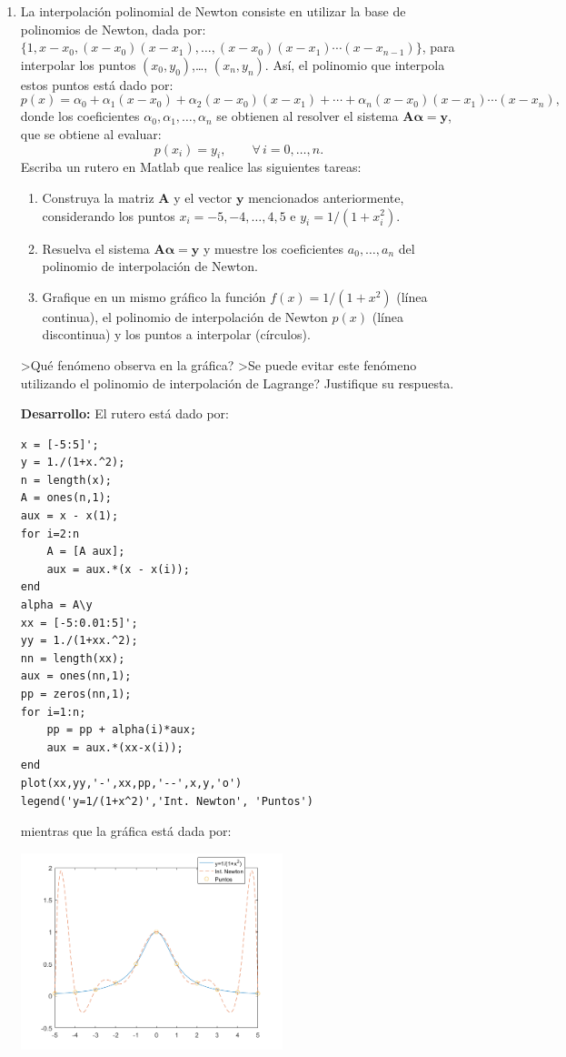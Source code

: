 \documentclass[letter,11pt]{article}
\newcommand{\matlab}{{\sc Matlab} }
\newcommand{\respuesta}[1]{
\noindent\makebox[\textwidth][r]{
\fbox{
\begin{minipage}{\textwidth}
\hfill
\vspace{#1}
\end{minipage}
}}}
\begin{document}
\begin{enumerate}
\item La interpolaci\'on polinomial de Newton consiste en utilizar la base de polinomios de Newton, dada por: $\{1, x-x_0, (x-x_0)(x-x_1),\ldots,(x-x_0)(x-x_1)\cdots(x-x_{n-1})\}$, para interpolar los puntos $(x_0,y_0)$,\ldots, $(x_n,y_n)$. As\'i, el polinomio que interpola estos puntos est\'a dado por:
$$
p(x)=\alpha_0+\alpha_1(x-x_0)+\alpha_2(x-x_0)(x-x_1)+\cdots+\alpha_n(x-x_0)(x-x_1)\cdots(x-x_n),
$$
donde los coeficientes $\alpha_0,\alpha_1,\ldots,\alpha_n$ se obtienen al resolver el sistema $\boldsymbol{A\alpha}=\boldsymbol{y}$, que se obtiene al evaluar:
$$
p(x_i)=y_i,\qquad \forall\,i=0,\ldots,n.
$$
Escriba un rutero en \matlab que realice las siguientes tareas:
\begin{enumerate}
\item Construya la matriz $\boldsymbol{A}$ y el vector $\boldsymbol{y}$ mencionados anteriormente, considerando los puntos $x_i=-5,-4,\ldots,4,5$ e $y_i=1/(1+x_i^2)$.
\item Resuelva el sistema $\boldsymbol{A\alpha}=\boldsymbol{y}$ y muestre los coeficientes $a_0,\ldots, a_n$ del polinomio de interpolaci\'on de Newton. 
\item Grafique en un mismo gr\'afico la funci\'on $f(x)=1/(1+x^2)$ (l\'inea continua), el polinomio de interpolaci\'on de Newton $p(x)$ (l\'inea discontinua) y los puntos a interpolar (c\'irculos).
\end{enumerate}
>Qu\'e fen\'omeno observa en la gr\'afica? >Se puede evitar este fen\'omeno utilizando el polinomio de interpolaci\'on de Lagrange? Justifique su respuesta. \bigskip

\respuesta{3cm}
\medskip

\textbf{Desarrollo:} El rutero est\'a dado por:

\begin{lstlisting}
x = [-5:5]';
y = 1./(1+x.^2);
n = length(x);
A = ones(n,1);
aux = x - x(1);
for i=2:n
    A = [A aux];
    aux = aux.*(x - x(i));
end
alpha = A\y
xx = [-5:0.01:5]';
yy = 1./(1+xx.^2);
nn = length(xx);
aux = ones(nn,1);
pp = zeros(nn,1);
for i=1:n;
    pp = pp + alpha(i)*aux;
    aux = aux.*(xx-x(i));
end
plot(xx,yy,'-',xx,pp,'--',x,y,'o')
legend('y=1/(1+x^2)','Int. Newton', 'Puntos')
\end{lstlisting}
mientras que la gr\'afica est\'a dada por:

\centerline{\includegraphics[width=0.6\textwidth]{inter_newton.png}}


\end{enumerate}
\end{document}
